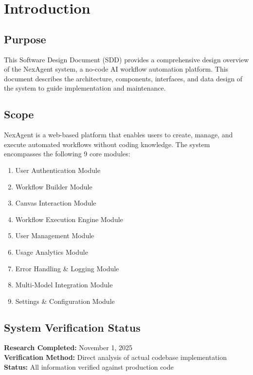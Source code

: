 \documentclass[12pt,a4paper]{article}
\begin{document}
\newpage

\section{Introduction}

\subsection{Purpose}
This Software Design Document (SDD) provides a comprehensive design overview of the NexAgent system, a no-code AI workflow automation platform. This document describes the architecture, components, interfaces, and data design of the system to guide implementation and maintenance.

\subsection{Scope}
NexAgent is a web-based platform that enables users to create, manage, and execute automated workflows without coding knowledge. The system encompasses the following 9 core modules:

\begin{enumerate}
    \item User Authentication Module
    \item Workflow Builder Module
    \item Canvas Interaction Module
    \item Workflow Execution Engine Module
    \item User Management Module
    \item Usage Analytics Module
    \item Error Handling \& Logging Module
    \item Multi-Model Integration Module
    \item Settings \& Configuration Module
\end{enumerate}

\subsection{System Verification Status}
\textbf{Research Completed:} November 1, 2025\\
\textbf{Verification Method:} Direct analysis of actual codebase implementation\\
\textbf{Status:} All information verified against production code
\end{document}
